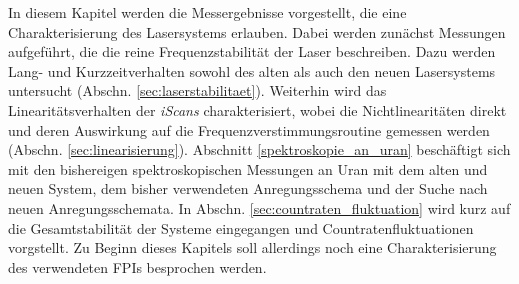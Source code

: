 In diesem Kapitel werden die Messergebnisse vorgestellt, die eine
Charakterisierung des Lasersystems erlauben. Dabei werden zunächst Messungen
aufgeführt, die die reine Frequenzstabilität der Laser beschreiben. Dazu werden
Lang- und Kurzzeitverhalten sowohl des alten als auch den neuen Lasersystems
untersucht (Abschn. \ref{sec:laserstabilitaet}). Weiterhin wird das
Linearitätsverhalten der \textit{iScans} charakterisiert, wobei die
Nichtlinearitäten direkt und deren Auswirkung auf die
Frequenzverstimmungsroutine gemessen werden (Abschn.
\ref{sec:linearisierung}). Abschnitt \ref{spektroskopie_an_uran} beschäftigt
sich mit den bishereigen spektroskopischen Messungen an Uran mit dem alten und
neuen System, dem bisher verwendeten Anregungsschema und der Suche nach neuen
Anregungsschemata. In Abschn. \ref{sec:countraten_fluktuation} wird kurz auf die
Gesamtstabilität der Systeme eingegangen und Countratenfluktuationen vorgstellt.
Zu Beginn dieses Kapitels soll allerdings noch eine Charakterisierung des
verwendeten FPIs besprochen werden.

